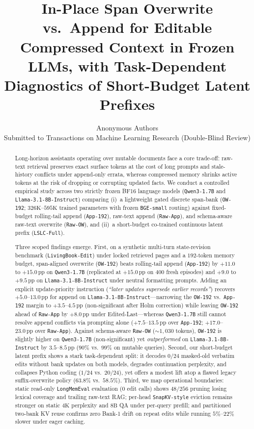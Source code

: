 \documentclass[11pt]{article}
\title{\textbf{In-Place Span Overwrite vs.\ Append for Editable Compressed Context in Frozen LLMs, with Task-Dependent Diagnostics of Short-Budget Latent Prefixes}}
\author{Anonymous Authors\\{\small Submitted to Transactions on Machine Learning Research (Double-Blind Review)}}
\date{}
\newcommand{\pp}{\,\text{pp}}
\renewcommand{\_}{\origunderscore\allowbreak}
\begin{document}
\maketitle
\vspace{-1.8em}



\begin{abstract}
Long-horizon assistants operating over mutable documents face a core trade-off: raw-text retrieval preserves exact surface tokens at the cost of long prompts and stale-history conflicts under append-only errata, whereas compressed memory shrinks active tokens at the risk of dropping or corrupting updated facts. We conduct a controlled empirical study across two strictly frozen BF16 language models (\texttt{Qwen3-1.7B} and \texttt{Llama-3.1-8B-Instruct}) comparing (i)~a lightweight gated discrete span-bank (\texttt{OW-192}; $326\text{K}$--$595\text{K}$ trained parameters with frozen \texttt{BGE-small} routing) against fixed-budget rolling-tail append (\texttt{App-192}), raw-text append (\texttt{Raw-App}), and schema-aware raw-text overwrite (\texttt{Raw-OW}), and (ii)~a short-budget co-trained continuous latent prefix (\texttt{LSLC-Full}).

Three scoped findings emerge. First, on a synthetic multi-turn state-revision benchmark (\texttt{LivingBook-Edit}) under locked retrieved pages and a $192$-token memory budget, span-aligned overwrite (\texttt{OW-192}) beats rolling-tail append (\texttt{App-192}) by $+11.0$ to $+15.0\pp$ on \texttt{Qwen3-1.7B} (replicated at $+15.0\pp$ on $400$ fresh episodes) and $+9.0$ to $+9.5\pp$ on \texttt{Llama-3.1-8B-Instruct} under neutral formatting prompts. Adding an explicit update-priority instruction (\emph{``later updates supersede earlier records''}) recovers $+5.0$--$13.0\pp$ for append on \texttt{Llama-3.1-8B-Instruct}---narrowing the \texttt{OW-192} vs.\ \texttt{App-192} margin to $+3.5$--$4.5\pp$ (non-significant after Holm correction) while leaving \texttt{OW-192} ahead of \texttt{Raw-App} by $+8.0\pp$ under Edited-Last---whereas \texttt{Qwen3-1.7B} still cannot resolve append conflicts via prompting alone ($+7.5$--$13.5\pp$ over \texttt{App-192}; $+17.0$--$23.0\pp$ over \texttt{Raw-App}). Against schema-aware \texttt{Raw-OW} ($\sim 1{,}030$ tokens), \texttt{OW-192} is slightly higher on \texttt{Qwen3-1.7B} (non-significant) yet \emph{outperformed} on \texttt{Llama-3.1-8B-Instruct} by $3.5$--$8.5\pp$ ($90\%$ vs.\ $99\%$ on mutable queries). Second, our short-budget latent prefix shows a stark task-dependent split: it decodes $0/24$ masked-old verbatim edits without bank updates on both models, degrades continuation perplexity, and collapses Python coding ($1/24$ vs.\ $20/24$), yet offers a modest lift atop a flawed legacy suffix-overwrite policy ($63.8\%$ vs.\ $58.5\%$). Third, we map operational boundaries: static read-only \texttt{LongMemEval} evaluation ($0$ edit calls) shows $48/256$ pruning losing lexical coverage and trailing raw-text RAG; per-head \texttt{SnapKV-style} eviction remains stronger on static $4\text{K}$ perplexity and $8\text{B}$ QA under per-query prefill; and partitioned two-bank KV reuse confirms zero Bank-1 drift on repeat edits while running $5\%$--$22\%$ slower under eager caching.
\end{abstract}
\end{document}
